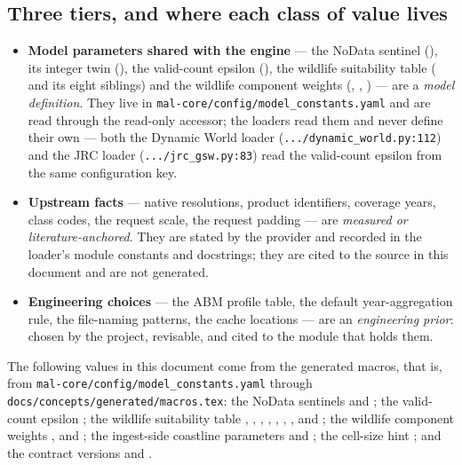 \documentclass[11pt,a4paper]{article}
\newcommand{\code}[1]{\texttt{#1}}
\begin{document}
\subsection{Three tiers, and where each class of value lives}

\begin{itemize}
\item \textbf{Model parameters shared with the engine} --- the NoData
sentinel (), its integer twin
(), the valid-count epsilon
(), the wildlife suitability table
( and its eight siblings) and the
wildlife component weights (,
, ) ---
are a \emph{model definition}. They live in
\code{mal-core/config/model\_constants.yaml} and are read through the
read-only accessor; the loaders read them and never define their own --- both
the Dynamic World loader
(\code{.../dynamic\_world.py:112}) and the JRC loader
(\code{.../jrc\_gsw.py:83}) read the valid-count epsilon from the same
configuration key.
\item \textbf{Upstream facts} --- native resolutions, product identifiers,
coverage years, class codes, the request scale, the
request padding --- are \emph{measured or literature-anchored}. They are
stated by the provider and recorded in the loader's module constants and
docstrings; they are cited to the source in this document and are not
generated.
\item \textbf{Engineering choices} --- the ABM profile table, the default
year-aggregation rule, the file-naming patterns, the cache locations --- are
an \emph{engineering prior}: chosen by the project, revisable, and cited to
the module that holds them.
\end{itemize}

The following values in this document come from the generated macros, that
is, from \code{mal-core/config/model\_constants.yaml} through
\code{docs/concepts/generated/macros.tex}: the NoData sentinels
 and ;
the valid-count epsilon ; the wildlife
suitability table ,
,
,
,
,
,
,
 and
; the wildlife component
weights ,  and
; the ingest-side coastline parameters
 and ;
the cell-size hint ; and the contract
versions  and .
\end{document}
